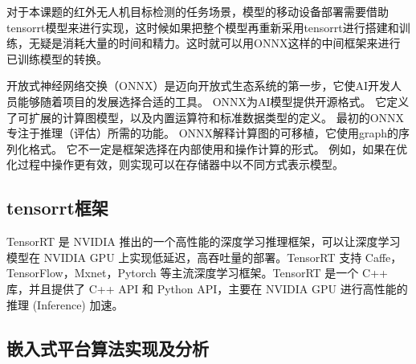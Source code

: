 对于本课题的红外无人机目标检测的任务场景，模型的移动设备部署需要借助tensorrt模型来进行实现，这时候如果把整个模型再重新采用tensorrt进行搭建和训练，无疑是消耗大量的时间和精力。这时就可以用ONNX这样的中间框架来进行已训练模型的转换。

开放式神经网络交换（ONNX）是迈向开放式生态系统的第一步，它使AI开发人员能够随着项目的发展选择合适的工具。 ONNX为AI模型提供开源格式。 它定义了可扩展的计算图模型，以及内置运算符和标准数据类型的定义。 最初的ONNX专注于推理（评估）所需的功能。 ONNX解释计算图的可移植，它使用graph的序列化格式。 它不一定是框架选择在内部使用和操作计算的形式。 例如，如果在优化过程中操作更有效，则实现可以在存储器中以不同方式表示模型。

\subsection{tensorrt框架}
TensorRT 是 NVIDIA 推出的一个高性能的深度学习推理框架，可以让深度学习模型在 NVIDIA GPU 上实现低延迟，高吞吐量的部署。TensorRT 支持 Caffe，TensorFlow，Mxnet，Pytorch 等主流深度学习框架。TensorRT 是一个 C++ 库，并且提供了 C++ API 和 Python API，主要在 NVIDIA GPU 进行高性能的推理 (Inference) 加速。

\subsection{嵌入式平台算法实现及分析}


